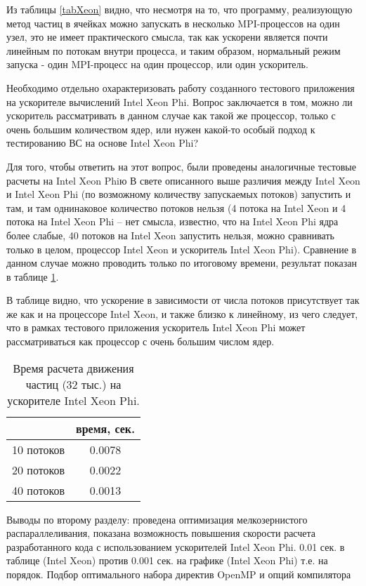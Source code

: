Из таблицы \ref{tabXeon} видно, что несмотря на то, что программу, реализующую метод частиц в ячейках можно запускать в несколько MPI-процессов на один узел, это не имеет практического смысла, так как ускорени является почти линейным по потокам внутри процесса, и таким образом, нормальный режим запуска - один MPI-процесс на один процессор, или один ускоритель.


Необходимо отдельно охарактеризовать работу созданного тестового приложения на ускорителе вычислений Intel Xeon Phi. Вопрос заключается в том, можно ли ускоритель рассматривать в данном случае как такой же процессор, только с очень большим количеством ядер, или нужен какой-то особый подход к тестированию ВС на основе Intel Xeon Phi?

Для того, чтобы ответить на этот вопрос, были проведены аналогичные тестовые расчеты на Intel Xeon Phiю 
В свете описанного выше различия между Intel Xeon и Intel Xeon Phi (по возможному количеству запускаемых потоков) запустить и там, и там однинаковое количество потоков нельзя (4 потока на Intel Xeon и 4 потока на Intel Xeon Phi – нет смысла, известно, что на Intel Xeon Phi ядра более слабые, 40 потоков на Intel Xeon запустить нельзя, можно сравнивать только в целом, процессор Intel Xeon и ускоритель Intel Xeon Phi). Сравнение в данном случае можно проводить только по итоговому времени, результат показан в таблице \ref{tabXeonPhi}. 

В таблице видно, что ускорение в зависимости от числа потоков присутствует так же как и на процессоре Intel Xeon, и также близко к линейному, из чего следует, что в рамках тестового приложения ускоритель Intel Xeon Phi может рассматриваться как процессор с очень большим числом ядер.


\begin{table} [htbp]
	\centering
	\changecaptionwidth\captionwidth{15cm}
	\caption{Время расчета движения частиц (32 тыс.) на ускорителе Intel Xeon Phi.}
	\label{tabXeonPhi}%
	\begin{tabular}{| c | c |}
		\hline
		            & время, сек.  \\ \hline
		10 потоков  & 0.0078    \\ \hline
		20 потоков  & 0.0022      \\ \hline
		40 потоков  & 0.0013        \\ \hline
	\end{tabular}
\end{table}


Выводы по второму разделу: проведена оптимизация мелкозернистого распараллеливания, показана возможность повышения скорости расчета разработанного кода с использованием ускорителей Intel Xeon Phi. 0.01 сек. в таблице (Intel Xeon) против 0.001 сек. на графике (Intel Xeon Phi) т.е. на порядок.
Подбор оптимального набора директив OpenMP и опций компилятора

